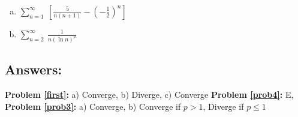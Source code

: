 \documentclass[10pt]{article}
\begin{document}
\begin{enumerate}
\begin{enumerate}[a)]
%
%
%
%

\item \(\sum_{n=1}^\infty \ \left[\frac{5}{n(n+1)}-\left(-\frac{1}{2}\right)^n\right]\)\vfill

\item \(\sum_{n=2}^\infty \ \frac{1}{n(\ln n)^p}\)\vfill

\end{enumerate}

\end{enumerate}

\subsection*{Answers:}
\textbf{Problem \ref{first}:} a) Converge, b) Diverge, c) Converge
\textbf{Problem \ref{prob4}:} E,\\
\textbf{Problem \ref{prob3}:} a) Converge, b) Converge if \(p> 1\), Diverge if \(p\leq 1\)

\end{document}
